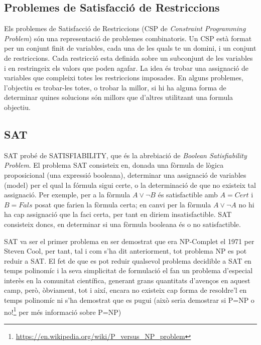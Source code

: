 \documentclass[11pt,a4paper,twoside]{report}
\begin{document}
 

  \subsection{Problemes de Satisfacció de Restriccions}
  
  Els problemes de Satisfacció de Restriccions (CSP de \textit{Constraint Programming Problem}) són una representació de problemes combinatoris. Un CSP està format per un conjunt finit de variables, cada una de les quals te un domini, i un conjunt de restriccions. Cada restricció esta definida sobre un subconjunt de les variables i en restringeix els valors que poden agafar. 
  La idea és trobar una assignació de variables que compleixi totes les restriccions imposades. En alguns problemes, l'objectiu es trobar-les totes, o trobar la millor, si hi ha alguna forma de determinar quines solucions són millors que d'altres utilitzant una formula objectiu.
  
  \subsection{SAT}

  SAT probé de SATISFIABILITY, que és la abrebiació de \textit{Boolean Satisfiability Problem}. 
  El problema SAT consisteix en, donada una fòrmula de lògica proposicional (una expressió booleana), determinar una assignació de variables (model) per el qual la fórmula sigui certe, o la determinació de que no existeix tal assignació.
  Per exemple, per a la fòrmula $A \vee \neg B$ és satisfactible amb $A = Cert$ i $B = Fals$ posat que farien la fòrmula certa; en canvi per la fòrmula $A \vee \neg A$ no hi ha cap assignació que la faci certa, per tant en diriem insatisfactible. 
  SAT consisteix doncs, en determinar si una fòrmula booleana és o no satisfactible.
  
  SAT va ser el primer problema en ser demostrat que era NP-Complet el 1971 per Steven Cool\cite{cook1971complexity}, per tant, tal i com s'ha dit anteriorment, tot problema NP es pot reduir a SAT.
  El fet de que es pot reduir qualsevol problema decidible a SAT en temps polinomíc i la seva simplicitat de formulació el fan un problema d'especial interès en la comunitat científica, generant grans quantitats d'avenços en aquest camp, 
  però, òbviament, tot i així, encara no existeix cap forma de resoldre'l en temps polinomíc ni s'ha demostrat que es pugui (això seria demostrar si P=NP o no!\footnote{\url{https://en.wikipedia.org/wiki/P_versus_NP_problem}} per més informació sobre P=NP)
  
\end{document}
